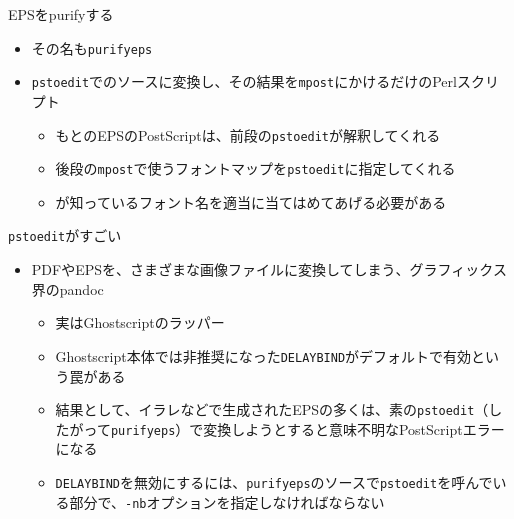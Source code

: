 \documentclass[14pt,dvipdfmx,uplatex]{beamer}
\begin{document}
\begin{frame}[t,fragile=singleslide]{\inhibitglue EPSをpurifyする}
  \sffamily
  \begin{itemize}
    \item その名も\texttt{purifyeps}
    \item \texttt{pstoedit}でのソースに変換し、その結果を\texttt{mpost}にかけるだけのPerlスクリプト
    \begin{itemize}
      \item もとのEPSのPostScriptは、前段の\texttt{pstoedit}が解釈してくれる
      \item 後段の\texttt{mpost}で使うフォントマップを\texttt{pstoedit}に指定してくれる
      \item {}が知っているフォント名を適当に当てはめてあげる必要がある
    \end{itemize}
  \end{itemize}
  \begin{center}
  \resizebox{100mm}{!}{}
  \end{center}
\end{frame}

\begin{frame}[t,fragile=singleslide]{\inhibitglue \texttt{pstoedit}がすごい}
  \sffamily
  \begin{itemize}
    \item PDFやEPSを、さまざまな画像ファイルに変換してしまう、グラフィックス界のpandoc
    \begin{itemize}
      \item 実はGhostscriptのラッパー
      \item Ghostscript本体では非推奨になった\texttt{DELAYBIND}がデフォルトで有効という罠がある
      \item 結果として、イラレなどで生成されたEPSの多くは、素の\texttt{pstoedit}（したがって\texttt{purifyeps}）で変換しようとすると意味不明なPostScriptエラーになる
      \item \texttt{DELAYBIND}を無効にするには、\texttt{purifyeps}のソースで\texttt{pstoedit}を呼んでいる部分で、\texttt{-nb}オプションを指定しなければならない
    \end{itemize}
  \end{itemize}

\end{frame}
\end{document}
